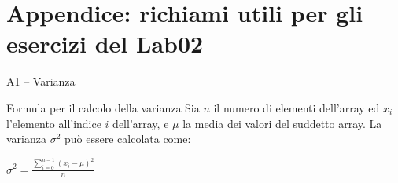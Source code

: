 \documentclass[xcolor=dvipsnames,presentation]{beamer}
\newcommand{\lab}{Lab02}
\begin{document}
\section{Appendice: richiami utili per gli esercizi del {\lab}}

\begin{frame}{A1 -- Varianza}

\begin{block}{Formula per il calcolo della varianza}
Sia $n$ il numero di elementi dell'array ed $x_i$ l'elemento all'indice $i$ dell'array, e $\mu$ la media dei valori del suddetto array. La varianza $\sigma^2$ può essere calcolata come:

\centering
\huge
$\sigma^2 = \frac{\displaystyle\sum_{i=0}^{n-1}(x_i - \mu)^2} {n}$
\end{block}
\end{frame}

%	
% 
\end{document}
